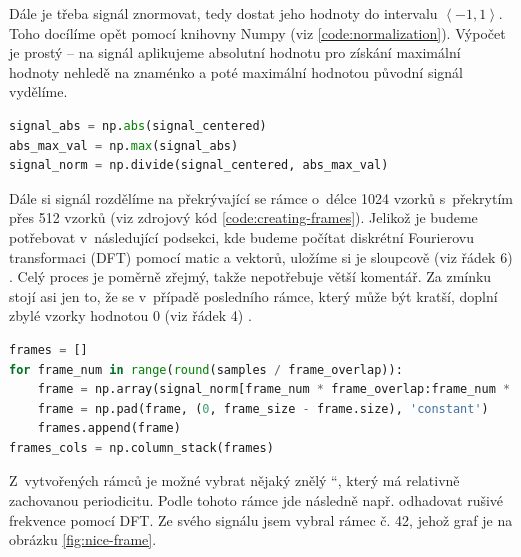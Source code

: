 \documentclass[a4paper, 11pt, final]{article}
\providecommand{\uv}[1]{\quotedblbase #1 \textquotedblleft}
\begin{document}
Dále je třeba signál znormovat, tedy dostat jeho hodnoty do intervalu $\left<-1, 1\right>$. Toho docílíme opět pomocí knihovny Numpy \cite{numpy-reference} (viz \ref{code:normalization}). Výpočet je prostý -- na signál aplikujeme absolutní hodnotu pro získání maximální hodnoty nehledě na znaménko a poté maximální hodnotou původní signál vydělíme.

\begin{lstlisting}[language=Python, caption=Normalizace signálu, label={code:normalization}]
signal_abs = np.abs(signal_centered)
abs_max_val = np.max(signal_abs)
signal_norm = np.divide(signal_centered, abs_max_val)
\end{lstlisting}

Dále si signál rozdělíme na překrývající se rámce o~délce 1024 vzorků s~překrytím přes 512 vzorků (viz zdrojový kód \ref{code:creating-frames}). Jelikož je budeme potřebovat v~následující podsekci, kde budeme počítat diskrétní Fourierovu transformaci (DFT) pomocí matic a vektorů, uložíme si je sloupcově (viz řádek 6) \cite{numpy-reference}. Celý proces je poměrně zřejmý, takže nepotřebuje větší komentář. Za zmínku stojí asi jen to, že se v~případě posledního rámce, který může být kratší, doplní zbylé vzorky hodnotou $0$ (viz řádek 4) \cite{numpy-reference}.

\begin{lstlisting}[language=Python, caption=Rozdělení na překrývající se rámce, label={code:creating-frames}]
frames = []
for frame_num in range(round(samples / frame_overlap)):
    frame = np.array(signal_norm[frame_num * frame_overlap:frame_num * frame_overlap + frame_size])
    frame = np.pad(frame, (0, frame_size - frame.size), 'constant')
    frames.append(frame)
frames_cols = np.column_stack(frames)
\end{lstlisting}

Z~vytvořených rámců je možné vybrat nějaký \uv{znělý}, který má relativně zachovanou periodicitu. Podle tohoto rámce jde následně např. odhadovat rušivé frekvence pomocí DFT. Ze svého signálu jsem vybral rámec č. 42, jehož graf je na obrázku \ref{fig:nice-frame}.
\end{document}
